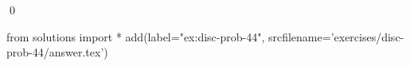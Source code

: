 
\begin{ex} 
  \label{ex:disc-prob-44}
  
  \qed
\end{ex} 
\begin{python0}
from solutions import *
add(label="ex:disc-prob-44",
    srcfilename='exercises/disc-prob-44/answer.tex') 
\end{python0}
